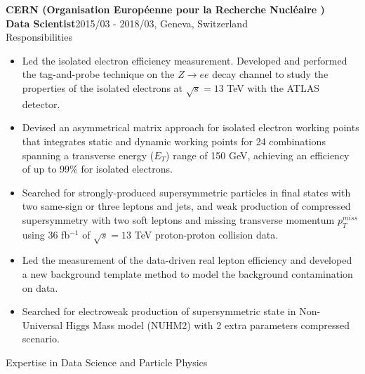\documentclass[margin, 10pt]{res} %
\begin{document}
\begin{resume}
\textbf{CERN (Organisation Européenne pour la Recherche Nucléaire )}\\
\textbf{Data Scientist}\hfill{2015/03 - 2018/03, Geneva, Switzerland}\\
\textrm{Responsibilities}
\begin{itemize}
    \item Led the isolated electron efficiency measurement. Developed and performed the tag-and-probe technique on the $Z \rightarrow ee$ decay channel to study the properties of the isolated electrons at $\sqrt{s} = 13$ TeV with the ATLAS detector.
    \item Devised an asymmetrical matrix approach for isolated electron working points that integrates static and dynamic working points for 24 combinations spanning a transverse energy ($E_{T}$) range of 150 GeV, achieving an efficiency of up to 99\% for isolated electrons.
    \item Searched for strongly-produced supersymmetric particles in final states with two same-sign or three leptons and jets, and weak production of compressed supersymmetry with two soft leptons and missing transverse momentum $p_{T}^{miss}$ using 36 fb$^{-1}$ of $\sqrt{s} = 13$ TeV proton-proton collision data.%
    \item Led the measurement of the data-driven real lepton efficiency and developed a new background template method to model the background contamination on data.
    \item Searched for electroweak production of supersymmetric state in Non-Universal Higgs Mass model (NUHM2) with 2 extra parameters compressed scenario.
\end{itemize}
\textrm{Expertise in Data Science and Particle Physics}
\begin{itemize}

\end{itemize}
\end{resume}
\end{document}
